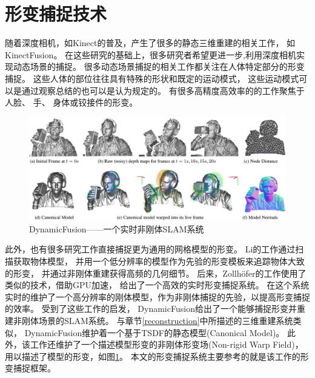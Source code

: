 \section{形变捕捉技术}
随着深度相机，如Kinect\cite{microsoft_kinect}的普及，产生了很多的静态三维重建的相关工作，
如KinectFusion\cite{newcombe2011kinectfusion}。
在这些研究的基础上，很多研究者希望更进一步,利用深度相机实现动态场景的捕捉。
很多动态场景捕捉的相关工作都关注在人体特定部分的形变捕捉。
这些人体的部位往往具有特殊的形状和既定的运动模式，
这些运动模式可以是通过观察总结的也可以是认为规定的。
有很多高精度高效率的的工作聚焦于人脸\cite{cao20133d}\cite{li2013realtime}、
手\cite{oikonomidis2011efficient}\cite{qian2014realtime}、
身体\cite{taylor2012vitruvian}或铰接件\cite{schmidt2014dart}\cite{ye2014real}的形变。
\begin{figure}[h]
    \centering
    \includegraphics[width = \textwidth]{./Pictures/dynamic_fusion.eps}
    \caption{DynamicFusion——一个实时非刚体SLAM系统}
    \label{dynamic_fusion}
\end{figure}

此外，也有很多研究工作直接捕捉更为通用的网格模型的形变。
Li的工作\cite{li2009robust}通过扫描获取物体模型，
并用一个低分辨率的模型作为先验的形变模板来追踪物体大致的形变，
并通过非刚体重建获得高频的几何细节。
后来，Zollh{\"o}fer\cite{zollhofer2014real}的工作使用了类似的技术，借助GPU加速，
给出了一个高效的实时形变捕捉系统。
在这个系统实时的维护了一个高分辨率的刚体模型，作为非刚体捕捉的先验，以提高形变捕捉的效率。
受到了这些工作的启发，
DynamicFusion\cite{newcombe2015dynamicfusion}给出了一个能够捕捉形变并重建非刚体场景的SLAM系统。
与章节\ref{reconstruction}中所描述的三维重建系统类似，
DynamicFusion维护着一个基于TSDF的静态模型(Canonical Model)。
此外，该工作还维护了一个描述模型形变的非刚体形变场(Non-rigid Warp Field)，
用以描述了模型的形变，如图\ref{dynamic_fusion}。
本文的形变捕捉系统主要参考的就是该工作的形变捕捉框架。
